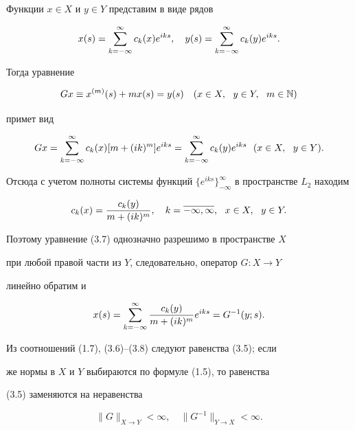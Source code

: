 Функции $x\in X$ и $y\in Y$ представим в виде рядов


\begin{equation}


x(s) = \suml_{k=-\infty}^\infty c_k(x)e^{iks},\quad y(s)


=\suml_{k=-\infty}^\infty c_k(y)e^{iks}.


\end{equation}


Тогда уравнение


\begin{equation}


Gx \equiv x^{(m)}(s) + mx(s) = y(s)\quad (x\in X,\ \ y\in Y,\ \ m\in \N)


\end{equation}


примет вид


$$


Gx = \suml_{k=-\infty}^\infty c_k(x)[m+(ik)^m]e^{iks} = \suml_{k=-


\infty}^\infty c_k(y) e^{iks}\ \


(x\in X,\ \ y\in Y).


$$


Отсюда с учетом полноты  системы функций $\{e^{iks}\}_{-


\infty}^\infty$  в пространстве $L_2$ находим


$$


c_k(x) = \frac{c_k(y)}{m+(ik)^m},\quad k=\ol{-\infty,\infty},\ \


x\in X,\ \ y\in Y.


$$


Поэтому уравнение (3.7) однозначно разрешимо в пространстве $X$


при любой правой части из $Y$, следовательно, оператор $G:X\to Y$


линейно обратим и


\begin{equation}


x(s) = \suml_{k=-\infty}^\infty \frac{c_k(y)}{m+(ik)^m}e^{iks} =


G^{-1}(y;s).


\end{equation}


Из соотношений (1.7), (3.6)--(3.8) следуют равенства (3.5); если


же нормы в $X$ и $Y$ выбираются по формуле (1.5), то равенства


(3.5) заменяются на неравенства


\begin{equation}


\|G\|_{X\to Y}< \infty,\quad \|G^{-1}\|_{Y\to X}<\infty.


\tag{$3.5'$}


\end{equation}





